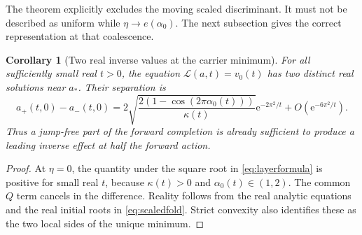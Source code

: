 \documentclass[11pt,a4paper]{article}
\numberwithin{equation}{section}
\newtheorem{corollary}[theorem]{Corollary}
\theoremstyle{definition}
\theoremstyle{remark}
\newcommand{\e}{\mathrm e}
\newcommand{\cL}{\mathcal L}
\begin{document}
The theorem explicitly excludes the moving scaled discriminant.
It must not be described as uniform while $\eta\to e(\alpha_0)$.
The next subsection gives the correct representation at that
coalescence.

\begin{corollary}[Two real inverse values at the carrier minimum]
\label{cor:tworeal}
For all sufficiently small real $t>0$, the equation
$\cL(a,t)=v_0(t)$ has two distinct real solutions near $a_*$. Their
separation is
\begin{equation}
 a_+(t,0)-a_-(t,0)
 =2\sqrt{\frac{2(1-\cos(2\pi\alpha_0(t)))}{\kappa(t)}}
         \e^{-2\pi^2/t}+O(\e^{-6\pi^2/t}).
 \label{eq:realgap}
\end{equation}
Thus a jump-free part of the forward completion is already sufficient
to produce a leading inverse effect at half the forward action.
\end{corollary}
\begin{proof}
At $\eta=0$, the quantity under the square root in
\eqref{eq:layerformula} is positive for small real $t$, because
$\kappa(t)>0$ and $\alpha_0(t)\in(1,2)$. The common $Q$ term cancels
in the difference. Reality follows from the real analytic equations
and the real initial roots in \eqref{eq:scaledfold}. Strict convexity
also identifies these as the two local sides of the unique minimum.
\end{proof}
\end{document}

